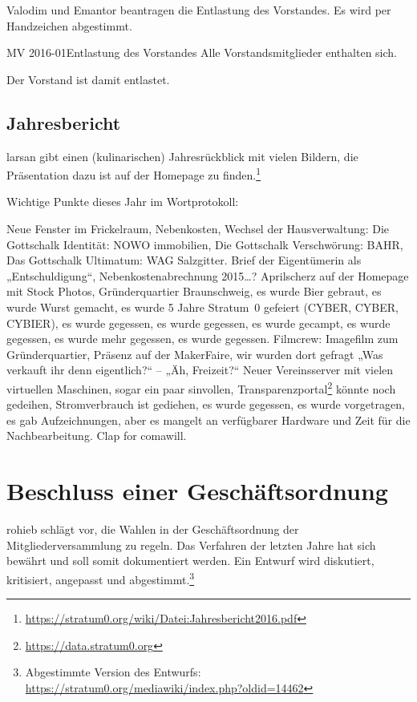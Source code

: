 \documentclass[parskip=half-]{s0minutes}
\begin{document}
Valodim und Emantor beantragen die Entlastung des Vorstandes. Es wird per
Handzeichen abgestimmt. 

\begin{resolution}{MV 2016-01}{}{Entlastung des
	Vorstandes}{}
	Alle Vorstandsmitglieder enthalten sich.
\end{resolution}

Der Vorstand ist damit entlastet.

\subsection{Jahresbericht}
larsan gibt einen (kulinarischen) Jahresrückblick mit vielen Bildern, die
Präsentation dazu ist auf der Homepage zu
finden.\footnote{\url{https://stratum0.org/wiki/Datei:Jahresbericht2016.pdf}}

Wichtige Punkte dieses Jahr im Wortprotokoll:

Neue Fenster im Frickelraum, Nebenkosten, Wechsel der Hausverwaltung: Die
Gottschalk Identität: NOWO immobilien, Die Gottschalk Verschwörung: BAHR, Das
Gottschalk Ultimatum: WAG Salzgitter. Brief der Eigentümerin als
„Entschuldigung“, Nebenkostenabrechnung 2015…? Aprilscherz auf der Homepage mit
Stock Photos, Gründerquartier Braunschweig, es wurde Bier gebraut, es wurde
Wurst gemacht, es wurde 5 Jahre Stratum~0 gefeiert (CYBER, CYBER, CYBIER), es
wurde gegessen, es wurde gegessen, es wurde gecampt, es wurde gegessen, es wurde
mehr gegessen, es wurde gegessen. Filmcrew: Imagefilm zum Gründerquartier,
Präsenz auf der MakerFaire, wir wurden dort gefragt „Was verkauft ihr denn
eigentlich?“ – „Äh, Freizeit?“ Neuer Vereinsserver mit vielen virtuellen
Maschinen, sogar ein paar sinvollen,
Transparenzportal\footnote{\url{https://data.stratum0.org}} könnte noch
gedeihen, Stromverbrauch ist gediehen, es wurde gegessen, es wurde vorgetragen,
es gab Aufzeichnungen, aber es mangelt an verfügbarer Hardware und Zeit für die
Nachbearbeitung. Clap for comawill.


\section{Beschluss einer Geschäftsordnung}

rohieb schlägt vor, die Wahlen in der Geschäftsordnung der Mitgliederversammlung
zu regeln. Das Verfahren der letzten Jahre hat sich bewährt und soll somit
dokumentiert werden. Ein Entwurf wird diskutiert, kritisiert, angepasst und
abgestimmt.\footnote{Abgestimmte Version des Entwurfs:
\url{https://stratum0.org/mediawiki/index.php?oldid=14462}}
\end{document}
